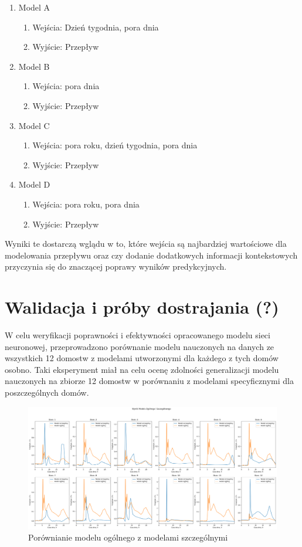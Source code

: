 \documentclass[a4paper,twoside,12pt]{book}
\begin{document}
\begin{enumerate}
	\item Model A
	      \begin{enumerate}
		      \item Wejścia: Dzień tygodnia, pora dnia
		      \item Wyjście: Przepływ
	      \end{enumerate}
	\item Model B
	      \begin{enumerate}
		      \item Wejścia: pora dnia
		      \item Wyjście: Przepływ
	      \end{enumerate}
	\item Model C
	      \begin{enumerate}
		      \item Wejścia: pora roku, dzień tygodnia, pora dnia
		      \item Wyjście: Przepływ
	      \end{enumerate}
	\item Model D
	      \begin{enumerate}
		      \item Wejścia: pora roku, pora dnia
		      \item Wyjście: Przepływ
	      \end{enumerate}
\end{enumerate}

Wyniki te dostarczą wglądu w to, które wejścia są najbardziej wartościowe dla modelowania przepływu oraz czy dodanie dodatkowych informacji kontekstowych przyczynia się do znaczącej poprawy wyników predykcyjnych.
\newpage

\section{Walidacja i próby dostrajania (?)}
W celu weryfikacji poprawności i efektywności opracowanego modelu sieci neuronowej, przeprowadzono porównanie modelu nauczonych na danych ze wszystkich 12 domostw z modelami utworzonymi dla każdego z tych domów osobno. Taki eksperyment miał na celu ocenę zdolności generalizacji modelu nauczonych na zbiorze 12 domostw w porównaniu z modelami specyficznymi dla poszczególnych domów.

\begin{figure}[!h]
	\centering
	\includegraphics[width=1\textwidth]{img/szczegółowy_ogolny_porówniaie.png}
	\caption{Porównianie modelu ogólnego z modelami szczególnymi}
	\label{fig:etykieta-rysunku}
\end{figure}
\end{document}
